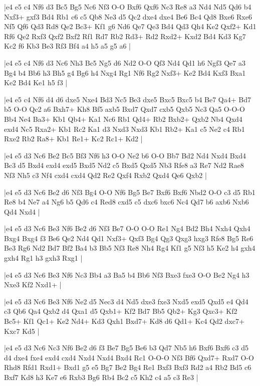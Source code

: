 \whitename{}
\blackname{}
\makegametitle
|e4 e5 c4 Nf6 d3 Bc5 Bg5 Nc6 Nf3 O-O Bxf6 Qxf6 Nc3 Re8 a3 Nd4 Nd5 Qd6 b4 Nxf3+ gxf3 Bd4 Rb1 c6 c5 Qb8 Ne3 d5 Qc2 dxe4 dxe4 Be6 Bc4 Qd8 Bxe6 Rxe6 Nf5 Qf6 Qd3 Rd8 Qe2 Bc3+ Kf1 g6 Nd6 Qe7 Qe3 Bd4 Qd3 Qh4 Ke2 Qxf2+ Kd1 Rf6 Qe2 Rxf3 Qxf2 Bxf2 Rf1 Rd7 Rb2 Rd3+ Rd2 Rxd2+ Kxd2 Bd4 Kd3 Kg7 Kc2 f6 Kb3 Be3 Rf3 Bf4 a4 h5 a5 g5 a6  |

\whitename{}
\blackname{}
\makegametitle
|e4 e5 c4 Nf6 d3 Nc6 Nh3 Bc5 Ng5 d6 Nd2 O-O Qf3 Nd4 Qd1 h6 Ngf3 Qe7 a3 Bg4 b4 Bb6 h3 Bh5 g4 Bg6 h4 Nxg4 Rg1 Nf6 Rg2 Nxf3+ Ke2 Bd4 Kxf3 Bxa1 Ke2 Bd4 Ke1 h5 f3  |

\whitename{}
\blackname{}
\makegametitle
|e4 e5 c4 Nf6 d4 d6 dxe5 Nxe4 Bd3 Nc5 Be3 dxe5 Bxc5 Bxc5 b4 Be7 Qa4+ Bd7 b5 O-O Qc2 a6 Bxh7+ Kh8 Bf5 axb5 Bxd7 Qxd7 cxb5 Qxb5 Nc3 Qa5 O-O-O Bb4 Ne4 Ba3+ Kb1 Qb4+ Ka1 Nc6 Rb1 Qd4+ Rb2 Bxb2+ Qxb2 Nb4 Qxd4 exd4 Nc5 Rxa2+ Kb1 Rc2 Ka1 d3 Nxd3 Nxd3 Kb1 Rb2+ Ka1 c5 Ne2 c4 Rb1 Rxe2 Rb2 Ra8+ Kb1 Re1+ Kc2 Rc1+ Kd2  |

\whitename{}
\blackname{}
\makegametitle
|e4 e5 d3 Nc6 Be2 Bc5 Bf3 Nf6 h3 O-O Ne2 b6 O-O Bb7 Bd2 Nd4 Nxd4 Bxd4 Bc3 d5 Bxd4 exd4 exd5 Bxd5 Nd2 c5 Bxd5 Qxd5 Nb3 Rfe8 a3 Re7 Nd2 Rae8 Nf3 Nh5 c3 Nf4 cxd4 cxd4 Qd2 Re2 Qxf4 Rxb2 Qxd4 Qe6 Qxb2  |

\whitename{}
\blackname{}
\makegametitle
|e4 e5 d3 Nc6 Be2 d6 Nf3 Bg4 O-O Nf6 Bg5 Be7 Bxf6 Bxf6 Nbd2 O-O c3 d5 Rb1 Re8 b4 Ne7 a4 Ng6 b5 Qd6 c4 Red8 cxd5 c5 dxc6 bxc6 Nc4 Qd7 b6 axb6 Nxb6 Qd4 Nxd4  |

\whitename{}
\blackname{}
\makegametitle
|e4 e5 d3 Nc6 Be3 Nf6 Be2 d6 Nf3 Be7 O-O O-O Re1 Ng4 Bd2 Bh4 Nxh4 Qxh4 Bxg4 Bxg4 f3 Be6 Qe2 Nd4 Qd1 Nxf3+ Qxf3 Bg4 Qg3 Qxg3 hxg3 Rfe8 Bg5 Re6 Be3 Rg6 Nd2 Bd7 Bf2 Ba4 b3 Bb5 Nf3 Re8 Nh4 Rg4 Kf1 g5 Nf3 h5 Ke2 h4 gxh4 gxh4 Rg1 h3 gxh3 Rxg1  |

\whitename{}
\blackname{}
\makegametitle
|e4 e5 d3 Nc6 Be3 Nf6 Nc3 Bb4 a3 Ba5 b4 Bb6 Nf3 Bxe3 fxe3 O-O Be2 Ng4 h3 Nxe3 Kf2 Nxd1+  |

\whitename{}
\blackname{}
\makegametitle
|e4 e5 d3 Nc6 Be3 Nf6 Ne2 d5 Nec3 d4 Nd5 dxe3 fxe3 Nxd5 exd5 Qxd5 e4 Qd4 c3 Qb6 Qa4 Qxb2 d4 Qxa1 d5 Qxb1+ Kf2 Bd7 Bb5 Qb2+ Kg3 Qxc3+ Kf2 Bc5+ Kf1 Qc1+ Ke2 Nd4+ Kd3 Qxh1 Bxd7+ Kd8 d6 Qd1+ Kc4 Qd2 dxc7+ Kxc7 Kd5  |

\whitename{}
\blackname{}
\makegametitle
|e4 e5 d3 Nc6 Nc3 Nf6 Be2 d6 f3 Be7 Bg5 Be6 b3 Qd7 Nb5 h6 Bxf6 Bxf6 c3 d5 d4 dxe4 fxe4 exd4 cxd4 Nxd4 Nxd4 Bxd4 Rc1 O-O-O Nf3 Bf6 Qxd7+ Rxd7 O-O Rhd8 Rfd1 Rxd1+ Bxd1 g5 e5 Bg7 Be2 Bg4 Re1 Bxf3 Bxf3 Rd2 a4 Rb2 Bd5 c6 Bxf7 Kd8 h3 Ke7 e6 Rxb3 Bg6 Rb4 Bc2 c5 Kh2 c4 a5 c3 Re3  |

